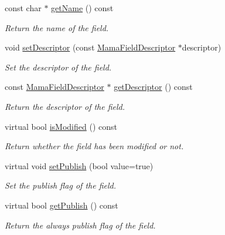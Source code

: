\begin{DoxyCompactItemize}
const char $\ast$ \hyperlink{classWombat_1_1MamaFieldCacheField_abe1b06ea7737ae6d9aa323d5ca2c1b78}{getName} () const 
\begin{DoxyCompactList}\small\item\em Return the name of the field. \item\end{DoxyCompactList}\item 
void \hyperlink{classWombat_1_1MamaFieldCacheField_a994ecf6a4620857e9b6d3669ca485dc3}{setDescriptor} (const \hyperlink{classWombat_1_1MamaFieldDescriptor}{MamaFieldDescriptor} $\ast$descriptor)
\begin{DoxyCompactList}\small\item\em Set the descriptor of the field. \item\end{DoxyCompactList}\item 
const \hyperlink{classWombat_1_1MamaFieldDescriptor}{MamaFieldDescriptor} $\ast$ \hyperlink{classWombat_1_1MamaFieldCacheField_a653c16e3b455088c37409a83cbe1f78c}{getDescriptor} () const 
\begin{DoxyCompactList}\small\item\em Return the descriptor of the field. \item\end{DoxyCompactList}\item 
virtual bool \hyperlink{classWombat_1_1MamaFieldCacheField_a13b4aed59d1cc1443cfcfbf904627136}{isModified} () const 
\begin{DoxyCompactList}\small\item\em Return whether the field has been modified or not. \item\end{DoxyCompactList}\item 
virtual void \hyperlink{classWombat_1_1MamaFieldCacheField_a68114cac0385bc88d9f807bacb2cfbaf}{setPublish} (bool value=true)
\begin{DoxyCompactList}\small\item\em Set the publish flag of the field. \item\end{DoxyCompactList}\item 
virtual bool \hyperlink{classWombat_1_1MamaFieldCacheField_a942030403dc608070ef021df497642ab}{getPublish} () const 
\begin{DoxyCompactList}\small\item\em Return the always publish flag of the field. \item\end{DoxyCompactList}\item 

\end{DoxyCompactItemize}
